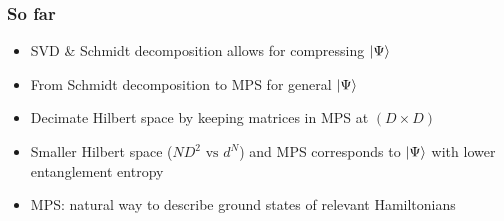 \documentclass{beamer}
\theoremstyle{definition}
\begin{document}
\begin{frame}
	\frametitle{So far}
	\begin{itemize}
		\item SVD \& Schmidt decomposition allows for compressing $\ket{\Psi}$ 
		\vspace{10pt} \pause
		
		\item From Schmidt decomposition to MPS for general $\ket{\Psi}$
		\vspace{10pt} \pause
		
		\item Decimate Hilbert space by keeping matrices in MPS at $(D\times D)$
		\vspace{10pt} \pause
		
		\item Smaller Hilbert space ($ND^2 \text{ vs } d^N$) and MPS  corresponds to $\ket{\Psi}$ with lower entanglement entropy
		\vspace{10pt} \pause
		
		\item MPS: natural way to describe ground states of relevant Hamiltonians 
	\end{itemize}
	
\end{frame}
\end{document}
